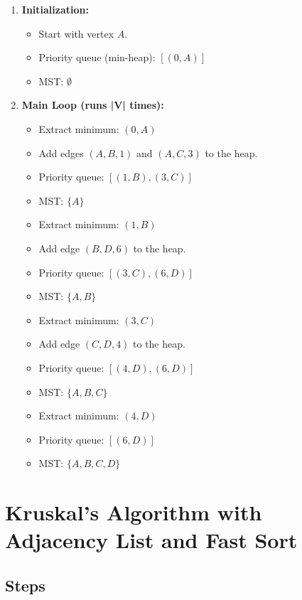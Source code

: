 \documentclass{article}
\begin{document}
\begin{enumerate}
    \item \textbf{Initialization:}
    \begin{itemize}
        \item Start with vertex \( A \).
        \item Priority queue (min-heap): \( [(0, A)] \)
        \item MST: \( \emptyset \)
    \end{itemize}
    \item \textbf{Main Loop (runs |V| times):}
    \begin{itemize}
        \item Extract minimum: \( (0, A) \)
        \item Add edges \( (A, B, 1) \) and \( (A, C, 3) \) to the heap.
        \item Priority queue: \( [(1, B), (3, C)] \)
        \item MST: \( \{A\} \)
        \item Extract minimum: \( (1, B) \)
        \item Add edge \( (B, D, 6) \) to the heap.
        \item Priority queue: \( [(3, C), (6, D)] \)
        \item MST: \( \{A, B\} \)
        \item Extract minimum: \( (3, C) \)
        \item Add edge \( (C, D, 4) \) to the heap.
        \item Priority queue: \( [(4, D), (6, D)] \)
        \item MST: \( \{A, B, C\} \)
        \item Extract minimum: \( (4, D) \)
        \item Priority queue: \( [(6, D)] \)
        \item MST: \( \{A, B, C, D\} \)
    \end{itemize}
\end{enumerate}

\section{Kruskal's Algorithm with Adjacency List and Fast Sort}

\subsection{Steps}
\end{document}

